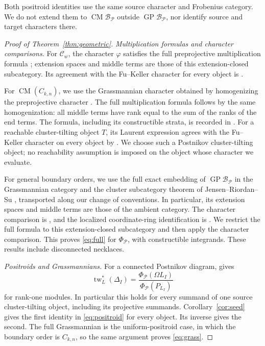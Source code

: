 \documentclass[11pt]{amsart}
\numberwithin{equation}{section}
\theoremstyle{definition}
\theoremstyle{remark}
\newcommand{\op}[1]{\operatorname{#1}}
\newcommand{\Pcal}{\mathcal P}
\newcommand{\CM}{\op{CM}}
\newcommand{\GP}{\op{GP}}
\newcommand{\tw}{\op{tw}}
\begin{document}
Both positroid identities use the same source character and Frobenius
category. We do not extend them to $\CM\mathcal B_\Pcal$ outside
$\GP\mathcal B_\Pcal$, nor identify source and target characters there.

\begin{proof}[Proof of Theorem~\ref{thm:geometric}]
\emph{Multiplication formulas and character comparisons.}
For $\mathcal C_w$, the character $\varphi$ satisfies the full
preprojective multiplication formula \cite[Theorem~1]{GLS07}; extension
spaces and middle terms are those of this extension-closed subcategory.
Its agreement with the Fu--Keller character for every object is
\cite[Theorem~4]{GLS12}.

For $\CM(C_{k,n})$, we use the Grassmannian character obtained
by homogenizing the preprojective character \cite[Section~9]{JKS16}.
The full multiplication formula follows by the same homogenization:
all middle terms have rank equal to the sum of the ranks of the end
terms. The formula, including its constructible strata, is recorded in
\cite[equation~(4.18)]{JRS26}. For a reachable cluster-tilting object
$T$, its Laurent expression agrees with the Fu--Keller character
on every object by \cite[Theorem~9.11]{JKS24}. We choose such a
Postnikov cluster-tilting object; no reachability assumption is imposed
on the object whose character we evaluate.

For general boundary orders, we use the full exact embedding of
$\GP\mathcal B_\Pcal$ in the Grassmannian category and the cluster
subcategory theorem of Jensen--Riordan--Su
\cite[Theorems~2.1 and 3.11]{JRS26}, transported along our change of
conventions. In particular, its extension spaces and middle terms are
those of the ambient category. The character comparison is
\cite[Proposition~4.1 and Corollary~4.2]{JRS26}, and the localized
coordinate-ring identification is \cite[Theorem~7.9]{JRS26}.
We restrict the full formula \cite[equation~(4.18)]{JRS26} to this
extension-closed subcategory and then apply the character comparison.
This proves \eqref{eq:full} for $\Phi_\Pcal$, with constructible
integrands. These results include disconnected necklaces.

\smallskip\noindent\emph{Positroids and Grassmannians.}
For a connected Postnikov diagram, \cite[Theorem~12.2]{CKP24} gives
\[ \tw_L^*(\Delta_I)= \frac{\Phi_\Pcal(\Omega L_I)}{\Phi_\Pcal(P_{L_I})} \]
for rank-one modules. In particular this holds for every summand of one
source cluster-tilting object, including its projective summands.
Corollary~\ref{cor:seed} gives the first identity in
\eqref{eq:positroid} for every object. Its inverse gives the second.
The full Grassmannian is the uniform-positroid case, in which the
boundary order is $C_{k,n}$, so the same argument proves
\eqref{eq:grass}.


\end{proof}
\end{document}
